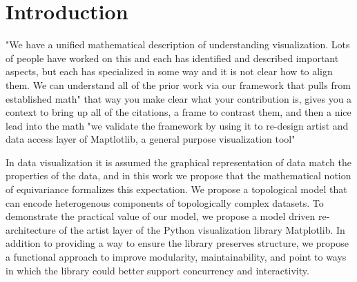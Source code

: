 \documentclass[../main.tex]{subfiles}
\begin{document}
\section{Introduction}
\label{sec:intro}
"We have a unified mathematical description of understanding visualization.  Lots of people have worked on this and each has identified and described important aspects, but each has specialized in some way and it is not clear how to align them.  We can understand all of the prior work via our framework that pulls from {established math}"
that way you make clear what your contribution is, gives you a context to bring up all of the citations, a frame to contrast them, and then a nice lead into the math
 "we validate the framework by using it to re-design artist and data access layer of Maptlotlib, a general purpose visualization tool"

In data visualization it is assumed the graphical representation of data match the properties of the data, and in this work we propose that the mathematical notion of equivariance formalizes this expectation. We propose a topological model that can encode heterogenous components of topologically complex datasets. To demonstrate the practical value of our model, we propose a model driven re-architecture of the artist layer of the Python visualization library Matplotlib. In addition to providing a way to ensure the library preserves structure, we propose a functional approach to  improve modularity, maintainability, and point to ways in which the library could better support concurrency and interactivity.
\end{document}
